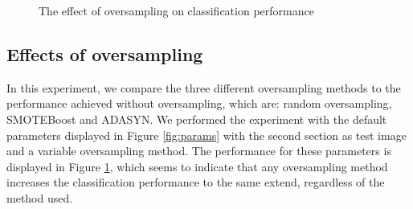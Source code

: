 \datathree

\begin{figure}[]
	\caption{The effect of oversampling on classification performance}
	\label{fig:res_bar_3}
\end{figure}


\subsection{Effects of oversampling}
In this experiment, we compare the three different oversampling methods to the performance achieved without oversampling, which are: random oversampling, SMOTEBoost and ADASYN. We performed the experiment with the default parameters displayed in Figure \ref{fig:params} with the second section as test image and a variable oversampling method. The performance for these parameters is displayed in Figure \ref{fig:res_bar_3}, which seems to indicate that any oversampling method increases the classification performance to the same extend, regardless of the method used.




